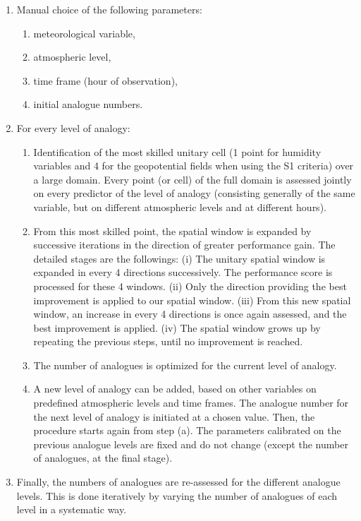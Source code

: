 \documentclass[twocol]{ametsoc}
\begin{document}
\begin{enumerate}
	\item Manual choice of the following parameters:
	\begin{enumerate}
		\item meteorological variable,
		\item atmospheric level,
		\item time frame (hour of observation),
		\item initial analogue numbers.
	\end{enumerate}
	
	\item For every level of analogy:
	\begin{enumerate}
		\item Identification of the most skilled unitary cell (1 point for humidity variables and 4 for the geopotential fields when using the S1 criteria) over a large domain. Every point (or cell) of the full domain is assessed jointly on every predictor of the level of analogy (consisting generally of the same variable, but on different atmospheric levels and at different hours).
		\item From this most skilled point, the spatial window is expanded by successive iterations in the direction of greater performance gain. The detailed stages are the followings: (i) The unitary spatial window is expanded in every 4 directions successively. The performance score is processed for these 4 windows. (ii) Only the direction providing the best improvement is applied to our spatial window. (iii) From this new spatial window, an increase in every 4 directions is once again assessed, and the best improvement is applied. (iv) The spatial window grows up by repeating the previous steps, until no improvement is reached.
		\item The number of analogues is optimized for the current level of analogy.
		\item A new level of analogy can be added, based on other variables on predefined atmospheric levels and time frames. The analogue number for the next level of analogy is initiated at a chosen value. Then, the procedure starts again from step (a). The parameters calibrated on the previous analogue levels are fixed and do not change (except the number of analogues, at the final stage). 
	\end{enumerate}
	\item Finally, the numbers of analogues are re-assessed for the different analogue levels. This is done iteratively by varying the number of analogues of each level in a systematic way.
\end{enumerate}
\end{document}
